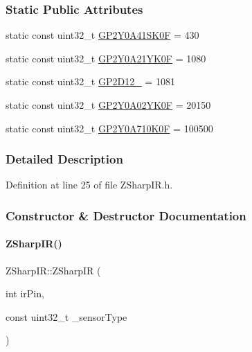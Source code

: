 \subsubsection*{Static Public Attributes}
\begin{DoxyCompactItemize}
\item 
static const uint32\+\_\+t \mbox{\hyperlink{class_z_sharp_i_r_a26dafed1122d774ee033e9ab10387a0e}{G\+P2\+Y0\+A41\+S\+K0F}} = 430
\item 
static const uint32\+\_\+t \mbox{\hyperlink{class_z_sharp_i_r_aa079c6041afab95db89c14a179fdfff1}{G\+P2\+Y0\+A21\+Y\+K0F}} = 1080
\item 
static const uint32\+\_\+t \mbox{\hyperlink{class_z_sharp_i_r_aa57ecb5df655ad5db0bd56e7bae59862}{G\+P2\+D12\+\_}} = 1081
\item 
static const uint32\+\_\+t \mbox{\hyperlink{class_z_sharp_i_r_a588056203604897b782c2ac771cd2536}{G\+P2\+Y0\+A02\+Y\+K0F}} = 20150
\item 
static const uint32\+\_\+t \mbox{\hyperlink{class_z_sharp_i_r_a06fb0d712f9124a1d9a5183bd4e5c2b4}{G\+P2\+Y0\+A710\+K0F}} = 100500
\end{DoxyCompactItemize}


\subsubsection{Detailed Description}


Definition at line 25 of file Z\+Sharp\+I\+R.\+h.



\subsubsection{Constructor \& Destructor Documentation}
\mbox{\label{class_z_sharp_i_r_a988604b3702878f8af55ba939ea3efb0}} 
\paragraph{\texorpdfstring{Z\+Sharp\+I\+R()}{ZSharpIR()}}
{\footnotesize\ttfamily Z\+Sharp\+I\+R\+::\+Z\+Sharp\+IR (\begin{DoxyParamCaption}\item[{int}]{ir\+Pin,  }\item[{const uint32\+\_\+t}]{\+\_\+sensor\+Type }\end{DoxyParamCaption})}



